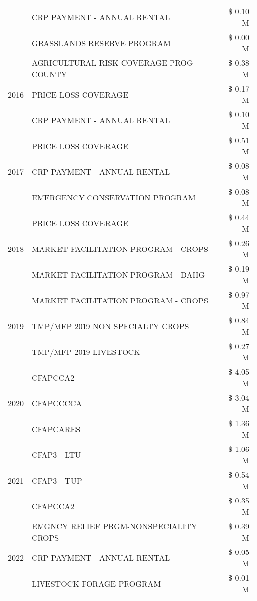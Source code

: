 \begin{tabular}{llr}
 & CRP PAYMENT - ANNUAL RENTAL & \$ 0.10 M \\
 & GRASSLANDS RESERVE PROGRAM & \$ 0.00 M \\
\cline{1-3}
\multirow[t]{3}{*}{2016} & AGRICULTURAL RISK COVERAGE PROG - COUNTY & \$ 0.38 M \\
 & PRICE LOSS COVERAGE & \$ 0.17 M \\
 & CRP PAYMENT - ANNUAL RENTAL & \$ 0.10 M \\
\cline{1-3}
\multirow[t]{3}{*}{2017} & PRICE LOSS COVERAGE & \$ 0.51 M \\
 & CRP PAYMENT - ANNUAL RENTAL & \$ 0.08 M \\
 & EMERGENCY CONSERVATION PROGRAM & \$ 0.08 M \\
\cline{1-3}
\multirow[t]{3}{*}{2018} & PRICE LOSS COVERAGE & \$ 0.44 M \\
 & MARKET FACILITATION PROGRAM - CROPS & \$ 0.26 M \\
 & MARKET FACILITATION PROGRAM - DAHG & \$ 0.19 M \\
\cline{1-3}
\multirow[t]{3}{*}{2019} & MARKET FACILITATION PROGRAM - CROPS & \$ 0.97 M \\
 & TMP/MFP 2019 NON SPECIALTY CROPS & \$ 0.84 M \\
 & TMP/MFP 2019 LIVESTOCK & \$ 0.27 M \\
\cline{1-3}
\multirow[t]{3}{*}{2020} & CFAPCCA2 & \$ 4.05 M \\
 & CFAPCCCCA & \$ 3.04 M \\
 & CFAPCARES & \$ 1.36 M \\
\cline{1-3}
\multirow[t]{3}{*}{2021} & CFAP3 - LTU & \$ 1.06 M \\
 & CFAP3 - TUP & \$ 0.54 M \\
 & CFAPCCA2 & \$ 0.35 M \\
\cline{1-3}
\multirow[t]{3}{*}{2022} & EMGNCY RELIEF PRGM-NONSPECIALITY CROPS & \$ 0.39 M \\
 & CRP PAYMENT - ANNUAL RENTAL & \$ 0.05 M \\
 & LIVESTOCK FORAGE PROGRAM & \$ 0.01 M \\
\cline{1-3}
\bottomrule
\end{tabular}

